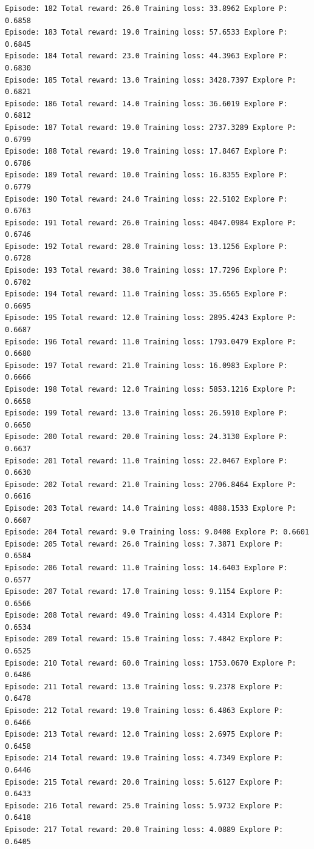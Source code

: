 \documentclass[11pt]{article}
\begin{document}
\begin{Verbatim}[commandchars=\\\{\}]
Episode: 182 Total reward: 26.0 Training loss: 33.8962 Explore P: 0.6858
Episode: 183 Total reward: 19.0 Training loss: 57.6533 Explore P: 0.6845
Episode: 184 Total reward: 23.0 Training loss: 44.3963 Explore P: 0.6830
Episode: 185 Total reward: 13.0 Training loss: 3428.7397 Explore P: 0.6821
Episode: 186 Total reward: 14.0 Training loss: 36.6019 Explore P: 0.6812
Episode: 187 Total reward: 19.0 Training loss: 2737.3289 Explore P: 0.6799
Episode: 188 Total reward: 19.0 Training loss: 17.8467 Explore P: 0.6786
Episode: 189 Total reward: 10.0 Training loss: 16.8355 Explore P: 0.6779
Episode: 190 Total reward: 24.0 Training loss: 22.5102 Explore P: 0.6763
Episode: 191 Total reward: 26.0 Training loss: 4047.0984 Explore P: 0.6746
Episode: 192 Total reward: 28.0 Training loss: 13.1256 Explore P: 0.6728
Episode: 193 Total reward: 38.0 Training loss: 17.7296 Explore P: 0.6702
Episode: 194 Total reward: 11.0 Training loss: 35.6565 Explore P: 0.6695
Episode: 195 Total reward: 12.0 Training loss: 2895.4243 Explore P: 0.6687
Episode: 196 Total reward: 11.0 Training loss: 1793.0479 Explore P: 0.6680
Episode: 197 Total reward: 21.0 Training loss: 16.0983 Explore P: 0.6666
Episode: 198 Total reward: 12.0 Training loss: 5853.1216 Explore P: 0.6658
Episode: 199 Total reward: 13.0 Training loss: 26.5910 Explore P: 0.6650
Episode: 200 Total reward: 20.0 Training loss: 24.3130 Explore P: 0.6637
Episode: 201 Total reward: 11.0 Training loss: 22.0467 Explore P: 0.6630
Episode: 202 Total reward: 21.0 Training loss: 2706.8464 Explore P: 0.6616
Episode: 203 Total reward: 14.0 Training loss: 4888.1533 Explore P: 0.6607
Episode: 204 Total reward: 9.0 Training loss: 9.0408 Explore P: 0.6601
Episode: 205 Total reward: 26.0 Training loss: 7.3871 Explore P: 0.6584
Episode: 206 Total reward: 11.0 Training loss: 14.6403 Explore P: 0.6577
Episode: 207 Total reward: 17.0 Training loss: 9.1154 Explore P: 0.6566
Episode: 208 Total reward: 49.0 Training loss: 4.4314 Explore P: 0.6534
Episode: 209 Total reward: 15.0 Training loss: 7.4842 Explore P: 0.6525
Episode: 210 Total reward: 60.0 Training loss: 1753.0670 Explore P: 0.6486
Episode: 211 Total reward: 13.0 Training loss: 9.2378 Explore P: 0.6478
Episode: 212 Total reward: 19.0 Training loss: 6.4863 Explore P: 0.6466
Episode: 213 Total reward: 12.0 Training loss: 2.6975 Explore P: 0.6458
Episode: 214 Total reward: 19.0 Training loss: 4.7349 Explore P: 0.6446
Episode: 215 Total reward: 20.0 Training loss: 5.6127 Explore P: 0.6433
Episode: 216 Total reward: 25.0 Training loss: 5.9732 Explore P: 0.6418
Episode: 217 Total reward: 20.0 Training loss: 4.0889 Explore P: 0.6405

\end{Verbatim}
\end{document}
